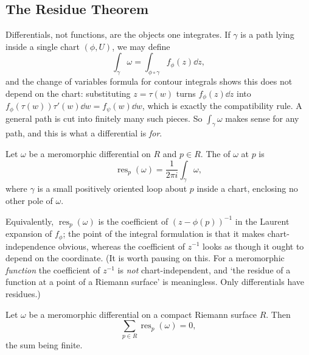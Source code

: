 \documentclass[a4paper]{scrartcl}
\newcommand{\res}{\operatorname{res}}
\begin{document}
\subsection{The Residue Theorem}

Differentials, not functions, are the objects one integrates. If $\gamma$ is a path lying
inside a single chart $(\phi, U)$, we may define
$$
\int_\gamma \omega = \int_{\phi\circ\gamma} f_\phi(z)\dd z,
$$
and the change of variables formula for contour integrals shows this does not depend on
the chart: substituting $z = \tau(w)$ turns $f_\phi(z)\dd z$ into
$f_\phi(\tau(w))\tau'(w)\dd w = f_\psi(w)\dd w$, which is exactly the compatibility rule.
A general path is cut into finitely many such pieces. So $\int_\gamma\omega$ makes sense
for any path, and this is what a differential is \emph{for}.

\begin{definition}[Residue]
	Let $\omega$ be a meromorphic differential on $R$ and $p \in R$. The 
	of $\omega$ at $p$ is
	$$
	\res_p(\omega) = \frac{1}{2\pi i}\int_\gamma \omega,
	$$
	where $\gamma$ is a small positively oriented loop about $p$ inside a chart, enclosing
	no other pole of $\omega$.
\end{definition}

Equivalently, $\res_p(\omega)$ is the coefficient of $(z - \phi(p))^{-1}$ in the Laurent
expansion of $f_\phi$; the point of the integral formulation is that it makes
chart-independence obvious, whereas the coefficient of $z^{-1}$ looks as though it ought
to depend on the coordinate. (It is worth pausing on this. For a meromorphic
\emph{function} the coefficient of $z^{-1}$ is \emph{not} chart-independent, and `the
residue of a function at a point of a Riemann surface' is meaningless. Only differentials
have residues.)

\begin{theorem}\label{thm:residuesum}
	Let $\omega$ be a meromorphic differential on a compact Riemann surface $R$. Then
	$$
	\sum_{p \in R}\res_p(\omega) = 0,
	$$
	the sum being finite.
\end{theorem}
\end{document}
